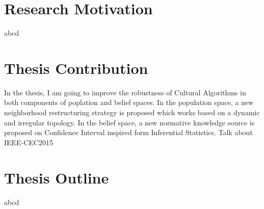 \section{Research Motivation}
abcd
\section{Thesis Contribution}
In the thesis, I am going to improve the robustness of Cultural Algorithms in both components of poplation and belief spaces. In the population space, a new neighborhood restructuring strategy is proposed which works based on a dynamic and irregular topology. In the belief space, a new normative knowledge source is proposed on Confidence Interval inspired form Inferential Statistics. Talk about IEEE-CEC2015 \cdots
\section{Thesis Outline}
abcd